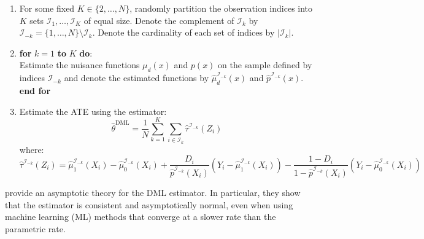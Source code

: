 \begin{enumerate}[label*=\textsc{Step} \arabic*]
    \item For some fixed $K \in \{2, \dots, N\}$, randomly partition the observation indices into $K$ sets $\mathcal{I}_1, \dots, \mathcal{I}_K$ of equal size. Denote the complement of $\mathcal{I}_k$ by $\mathcal{I}_{-k} = \{1, \dots, N\}\setminus\mathcal{I}_k$. Denote the cardinality of each set of indices by $\vert \mathcal{I}_k \vert$.
    \item \textbf{for} $k=1$ \textbf{to} $K$ \textbf{do}:\\[0.2cm]
    \indent Estimate the nuisance functions $\mu_d(x)$ and $p(x)$ on the sample defined by indices $\mathcal{I}_{-k}$ and denote the estimated functions by $\widehat{\mu}_d^{\mathcal{I}_{-k}}(x)$ and $\widehat{p}^{\mathcal{I}_{-k}}(x)$.\\[0.2cm]
    \textbf{end for}
    \item Estimate the ATE using the estimator:
    \begin{equation}
        \widehat{\theta}^{\text{DML}} = \frac{1}{N}\sum_{k=1}^{K} \sum_{i\in\mathcal{I}_k} \widehat\tau^{\mathcal{I}_{-k}}(Z_i)
    \end{equation}
    where:
    \begin{equation*}
        \widehat\tau^{\mathcal{I}_{-k}}(Z_i) = \widehat\mu^{\mathcal{I}_{-k}}_1(X_i) - \widehat\mu^{\mathcal{I}_{-k}}_0(X_i) + \frac{D_i}{\widehat{p}^{\mathcal{I}_{-k}}(X_i)}(Y_i-\widehat\mu^{\mathcal{I}_{-k}}_1(X_i)) - \frac{1-D_i}{1-\widehat{p}^{\mathcal{I}_{-k}}(X_i)}(Y_i-\widehat\mu^{\mathcal{I}_{-k}}_0(X_i))
    \end{equation*}
\end{enumerate}

\cite{Chernozhukov2018} provide an asymptotic theory for the DML estimator. In particular, they show that the estimator is consistent and asymptotically normal, even when using machine learning (ML) methods that converge at a slower rate than the parametric rate.

